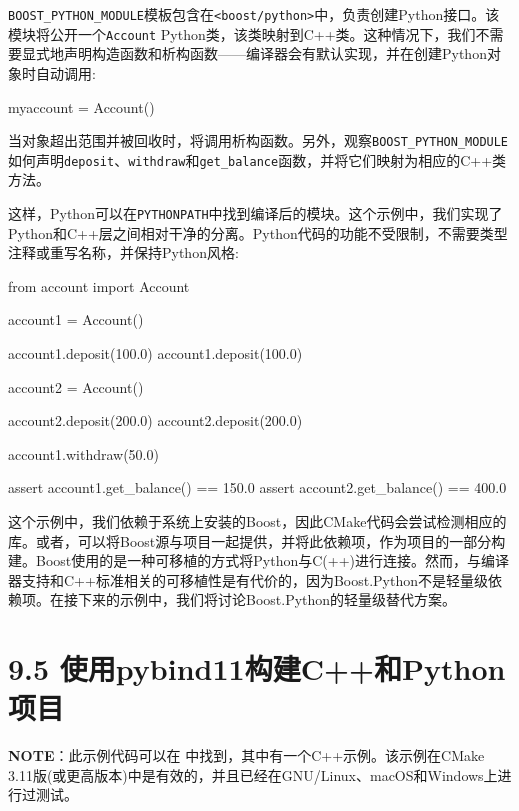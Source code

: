 \texttt{BOOST\_PYTHON\_MODULE}模板包含在\texttt{<boost/python>}中，负责创建Python接口。该模块将公开一个\texttt{Account} Python类，该类映射到C++类。这种情况下，我们不需要显式地声明构造函数和析构函数——编译器会有默认实现，并在创建Python对象时自动调用:

\begin{codebox}[cpp]
myaccount = Account()
\end{codebox}

当对象超出范围并被回收时，将调用析构函数。另外，观察\texttt{BOOST\_PYTHON\_MODULE}如何声明\texttt{deposit}、\texttt{withdraw}和\texttt{get\_balance}函数，并将它们映射为相应的C++类方法。

这样，Python可以在\texttt{PYTHONPATH}中找到编译后的模块。这个示例中，我们实现了Python和C++层之间相对干净的分离。Python代码的功能不受限制，不需要类型注释或重写名称，并保持Python风格:

\begin{codebox}[python]
from account import Account

account1 = Account()

account1.deposit(100.0)
account1.deposit(100.0)

account2 = Account()

account2.deposit(200.0)
account2.deposit(200.0)

account1.withdraw(50.0)

assert account1.get_balance() == 150.0
assert account2.get_balance() == 400.0
\end{codebox}


这个示例中，我们依赖于系统上安装的Boost，因此CMake代码会尝试检测相应的库。或者，可以将Boost源与项目一起提供，并将此依赖项，作为项目的一部分构建。Boost使用的是一种可移植的方式将Python与C(++)进行连接。然而，与编译器支持和C++标准相关的可移植性是有代价的，因为Boost.Python不是轻量级依赖项。在接下来的示例中，我们将讨论Boost.Python的轻量级替代方案。


\section{9.5 使用pybind11构建C++和Python项目}

\begin{myInfoBox}
\textbf{NOTE}：此示例代码可以在  中找到，其中有一个C++示例。该示例在CMake 3.11版(或更高版本)中是有效的，并且已经在GNU/Linux、macOS和Windows上进行过测试。
\end{myInfoBox}

